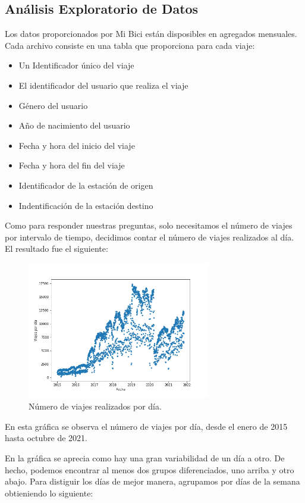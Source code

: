 \documentclass[
]{article}
\begin{document}
\hypertarget{anuxe1lisis-exploratorio-de-datos}{%
\subsection{Análisis Exploratorio de
Datos}\label{anuxe1lisis-exploratorio-de-datos}}

Los datos proporcionados por Mi Bici están disposibles en agregados
mensuales. Cada archivo consiste en una tabla que proporciona para cada
viaje:

\begin{itemize}
\item
  Un Identificador único del viaje
\item
  El identificador del usuario que realiza el viaje
\item
  Género del usuario
\item
  Año de nacimiento del usuario
\item
  Fecha y hora del inicio del viaje
\item
  Fecha y hora del fin del viaje
\item
  Identificador de la estación de origen
\item
  Indentificación de la estación destino
\end{itemize}

Como para responder nuestras preguntas, solo necesitamos el número de
viajes por intervalo de tiempo, decidimos contar el número de viajes
realizados al día. El resultado fue el siguiente:

\begin{figure}[!h]
\centering
\includegraphics[width=8cm, height=6cm]{../plots/trips_daily.png}
\caption{Número de viajes realizados por día.}
\end{figure}

En esta gráfica se observa el número de viajes por día, desde el enero
de 2015 hasta octubre de 2021.

En la gráfica se aprecia como hay una gran variabilidad de un día a
otro. De hecho, podemos encontrar al menos dos grupos diferenciados, uno
arriba y otro abajo. Para distiguir los días de mejor manera, agrupamos
por días de la semana obtieniendo lo siguiente:
\end{document}
